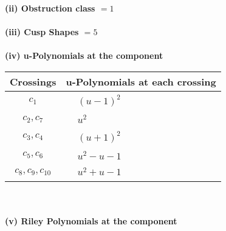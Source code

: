\documentclass[1p]{elsarticle_modified}
\theoremstyle{definition}
\begin{document}
\flushleft \textbf{(ii) Obstruction class $= 1$}\\~\\
\flushleft \textbf{(iii) Cusp Shapes $= 5$}\\~\\
\newpage\renewcommand{\arraystretch}{1}
\flushleft \textbf{(iv) u-Polynomials at the component}\newline \\
\begin{tabular}{m{50pt}|m{274pt}}
Crossings & \hspace{64pt}u-Polynomials at each crossing \\
\hline $$\begin{aligned}c_{1}\end{aligned}$$&$\begin{aligned}
&(u-1)^2
\end{aligned}$\\
\hline $$\begin{aligned}c_{2},c_{7}\end{aligned}$$&$\begin{aligned}
&u^2
\end{aligned}$\\
\hline $$\begin{aligned}c_{3},c_{4}\end{aligned}$$&$\begin{aligned}
&(u+1)^2
\end{aligned}$\\
\hline $$\begin{aligned}c_{5},c_{6}\end{aligned}$$&$\begin{aligned}
&u^2- u-1
\end{aligned}$\\
\hline $$\begin{aligned}c_{8},c_{9},c_{10}\end{aligned}$$&$\begin{aligned}
&u^2+u-1
\end{aligned}$\\
\hline
\end{tabular}\\~\\
\newpage\renewcommand{\arraystretch}{1}
\flushleft \textbf{(v) Riley Polynomials at the component}\newline \\
\end{document}
